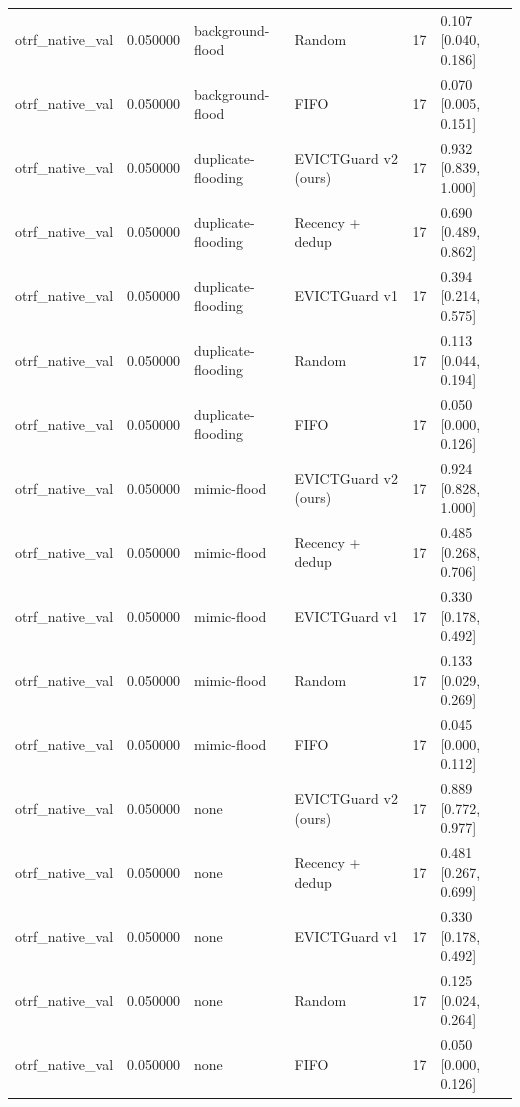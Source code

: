 \begin{tabular}{lrllrl}
otrf\_native\_val & 0.050000 & background-flood & Random & 17 & 0.107 [0.040, 0.186] \\
otrf\_native\_val & 0.050000 & background-flood & FIFO & 17 & 0.070 [0.005, 0.151] \\
otrf\_native\_val & 0.050000 & duplicate-flooding & EVICTGuard v2 (ours) & 17 & 0.932 [0.839, 1.000] \\
otrf\_native\_val & 0.050000 & duplicate-flooding & Recency + dedup & 17 & 0.690 [0.489, 0.862] \\
otrf\_native\_val & 0.050000 & duplicate-flooding & EVICTGuard v1 & 17 & 0.394 [0.214, 0.575] \\
otrf\_native\_val & 0.050000 & duplicate-flooding & Random & 17 & 0.113 [0.044, 0.194] \\
otrf\_native\_val & 0.050000 & duplicate-flooding & FIFO & 17 & 0.050 [0.000, 0.126] \\
otrf\_native\_val & 0.050000 & mimic-flood & EVICTGuard v2 (ours) & 17 & 0.924 [0.828, 1.000] \\
otrf\_native\_val & 0.050000 & mimic-flood & Recency + dedup & 17 & 0.485 [0.268, 0.706] \\
otrf\_native\_val & 0.050000 & mimic-flood & EVICTGuard v1 & 17 & 0.330 [0.178, 0.492] \\
otrf\_native\_val & 0.050000 & mimic-flood & Random & 17 & 0.133 [0.029, 0.269] \\
otrf\_native\_val & 0.050000 & mimic-flood & FIFO & 17 & 0.045 [0.000, 0.112] \\
otrf\_native\_val & 0.050000 & none & EVICTGuard v2 (ours) & 17 & 0.889 [0.772, 0.977] \\
otrf\_native\_val & 0.050000 & none & Recency + dedup & 17 & 0.481 [0.267, 0.699] \\
otrf\_native\_val & 0.050000 & none & EVICTGuard v1 & 17 & 0.330 [0.178, 0.492] \\
otrf\_native\_val & 0.050000 & none & Random & 17 & 0.125 [0.024, 0.264] \\
otrf\_native\_val & 0.050000 & none & FIFO & 17 & 0.050 [0.000, 0.126] \\
\bottomrule
\end{tabular}
